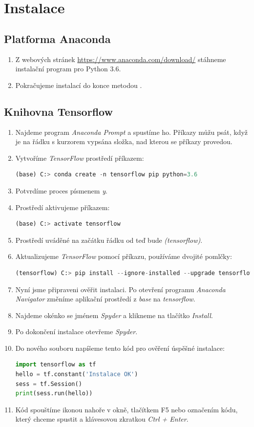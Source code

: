 \documentclass[12pt,a4paper]{report}
\begin{document}
\chapter{Instalace}
	\section{Platforma Anaconda}
	\begin{enumerate}
		\item Z webových stránek \url{https://www.anaconda.com/download/} stáhneme instalační program pro Python 3.6.
		\item Pokračujeme instalací do konce metodou .
	\end{enumerate}
		\section{Knihovna Tensorflow}
		\begin{enumerate}
		\item Najdeme program \textit{Anaconda Prompt} a spustíme ho. Příkazy můžu psát, když je na řádku s kurzorem vypsána složka, nad kterou se příkazy provedou.
		\item Vytvoříme \textit{TensorFlow} prostředí příkazem:
		\begin{lstlisting}[language=Python]
(base) C:> conda create -n tensorflow pip python=3.6
		\end{lstlisting}
		\item Potvrdíme proces písmenem \textit{y}.
		\item Prostředí aktivujeme příkazem:
		\begin{lstlisting}[language=Python]
(base) C:> activate tensorflow
		\end{lstlisting}
		\item Prostředí uváděné na začátku řádku od teď bude \textit{(tensorflow)}.
		\item Aktualizujeme \textit{TensorFlow} pomocí příkazu, používáme dvojité pomlčky:
		\begin{lstlisting}[language=Python]
(tensorflow) C:> pip install --ignore-installed --upgrade tensorflow 
		\end{lstlisting}
		\item Nyní jsme připraveni ověřit instalaci. Po otevření programu \textit{Anaconda Navigator} změníme aplikační prostředí z \textit{base} na \textit{tensorflow}.
		\item Najdeme okénko se jménem \textit{Spyder} a klikneme na tlačítko \textit{Install}.
		\item Po dokončení instalace otevřeme \textit{Spyder}.
		\item Do nového souboru napíšeme tento kód pro ověření úspěšné instalace:
		\begin{lstlisting}[language=Python]
import tensorflow as tf
hello = tf.constant('Instalace OK')
sess = tf.Session()
print(sess.run(hello))
		\end{lstlisting}
		\item Kód spouštíme ikonou nahoře v okně, tlačítkem F5 nebo označením kódu, který chceme spustit a klávesovou zkratkou \textit{Ctrl + Enter}.
	\end{enumerate}
\end{document}
